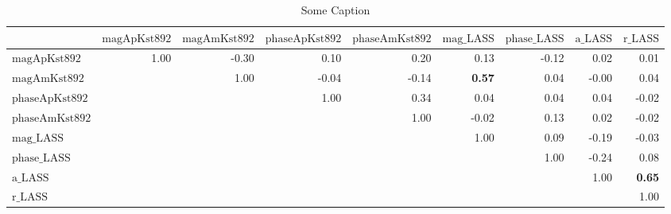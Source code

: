 \renewcommand{\pm}{\ensuremath{\oldpm} }
\begin{sidewaystable}[h]
\begin{center}
\begin{tabular}{@{}|l|r|r|r|r|r|r|r|r|@{}}
\hline
 & $\text{magApKst892}$ & $\text{magAmKst892}$ & $\text{phaseApKst892}$ & $\text{phaseAmKst892}$ & $\text{mag\_LASS}$ & $\text{phase\_LASS}$ & $\text{a\_LASS}$ & $\text{r\_LASS}$\\ \hline \hline
$\text{magApKst892}$ & 1.00 & -0.30 & 0.10 & 0.20 & 0.13 & -0.12 & 0.02 & 0.01 \\
$\text{magAmKst892}$ &  & 1.00 & -0.04 & -0.14 & \bf{0.57} & 0.04 & -0.00 & 0.04 \\
$\text{phaseApKst892}$ &  &  & 1.00 & 0.34 & 0.04 & 0.04 & 0.04 & -0.02 \\
$\text{phaseAmKst892}$ &  &  &  & 1.00 & -0.02 & 0.13 & 0.02 & -0.02 \\
$\text{mag\_LASS}$ &  &  &  &  & 1.00 & 0.09 & -0.19 & -0.03 \\
$\text{phase\_LASS}$ &  &  &  &  &  & 1.00 & -0.24 & 0.08 \\
$\text{a\_LASS}$ &  &  &  &  &  &  & 1.00 & \bf{0.65} \\
$\text{r\_LASS}$ &  &  &  &  &  &  &  & 1.00 \\
\hline
\end{tabular}
\caption{Some Caption}
\label{thisTable}
\end{center}
\end{sidewaystable}
\renewcommand{\pm}{\oldpm}
\restoregeometry

